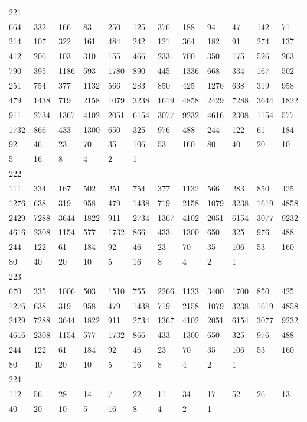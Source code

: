 \begin{longtable}{llllllllllll}
221&&&&&&&&&&&\\
664& 332& 166& 83& 250& 125& 376& 188& 94& 47& 142& 71\\
214& 107& 322& 161& 484& 242& 121& 364& 182& 91& 274& 137\\
412& 206& 103& 310& 155& 466& 233& 700& 350& 175& 526& 263\\
790& 395& 1186& 593& 1780& 890& 445& 1336& 668& 334& 167& 502\\
251& 754& 377& 1132& 566& 283& 850& 425& 1276& 638& 319& 958\\
479& 1438& 719& 2158& 1079& 3238& 1619& 4858& 2429& 7288& 3644& 1822\\
911& 2734& 1367& 4102& 2051& 6154& 3077& 9232& 4616& 2308& 1154& 577\\
1732& 866& 433& 1300& 650& 325& 976& 488& 244& 122& 61& 184\\
92& 46& 23& 70& 35& 106& 53& 160& 80& 40& 20& 10\\
5& 16& 8& 4& 2& 1& \\

222&&&&&&&&&&&\\
111& 334& 167& 502& 251& 754& 377& 1132& 566& 283& 850& 425\\
1276& 638& 319& 958& 479& 1438& 719& 2158& 1079& 3238& 1619& 4858\\
2429& 7288& 3644& 1822& 911& 2734& 1367& 4102& 2051& 6154& 3077& 9232\\
4616& 2308& 1154& 577& 1732& 866& 433& 1300& 650& 325& 976& 488\\
244& 122& 61& 184& 92& 46& 23& 70& 35& 106& 53& 160\\
80& 40& 20& 10& 5& 16& 8& 4& 2& 1& \\

223&&&&&&&&&&&\\
670& 335& 1006& 503& 1510& 755& 2266& 1133& 3400& 1700& 850& 425\\
1276& 638& 319& 958& 479& 1438& 719& 2158& 1079& 3238& 1619& 4858\\
2429& 7288& 3644& 1822& 911& 2734& 1367& 4102& 2051& 6154& 3077& 9232\\
4616& 2308& 1154& 577& 1732& 866& 433& 1300& 650& 325& 976& 488\\
244& 122& 61& 184& 92& 46& 23& 70& 35& 106& 53& 160\\
80& 40& 20& 10& 5& 16& 8& 4& 2& 1& \\

224&&&&&&&&&&&\\
112& 56& 28& 14& 7& 22& 11& 34& 17& 52& 26& 13\\
40& 20& 10& 5& 16& 8& 4& 2& 1& \\


\end{longtable}
